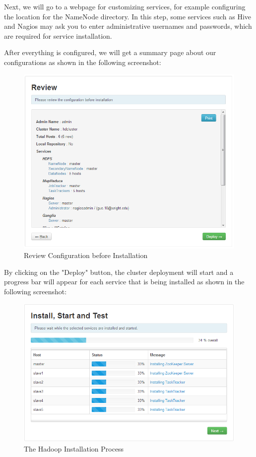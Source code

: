 Next, we will go to a webpage for customizing services, for example configuring the location for the NameNode directory. In this step, some services such as Hive and Nagios may ask you to enter administrative usernames and passwords, which are required for service installation.

After everything is configured, we will get a summary page about our configurations as shown in the following screenshot:
\begin{figure}[h]
  \centering
  \includegraphics[width=.8\textwidth]{figs/5163os_06_22.png}
  \caption{Review Configuration before Installation}\label{fig:config.review}
\end{figure} 


By clicking on the "Deploy" button, the cluster deployment will start and a progress bar will appear for each service that is being installed as shown in the following screenshot:
\begin{figure}[h]
  \centering
  \includegraphics[width=.8\textwidth]{figs/5163os_06_24.png}
  \caption{The Hadoop Installation Process}\label{fig:hadoop.install.process}
\end{figure} 

